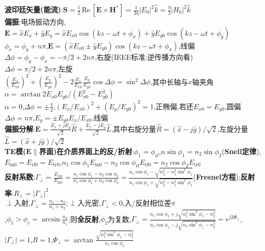 \documentclass[a4paper,10pt]{article}
\providecommand{\abs}[1]{\lvert#1\rvert}
\providecommand{\re}{\,\text{Re}\,}
\begin{document}
\begin{multicols}{2}
\textbf{波印廷矢量(能流)}:$\bm{S}=\frac{1}{2}\re[\bm{E}\times\bm{H}^*]=\frac{1}{2\eta}\abs{E_0}^2\hat{k}=\frac{\eta}{2}\abs{H_0}^2\hat{k}$\\
\textbf{偏振}:电场振动方向,$\bm{E}=\hat{x}E_x+\hat{y}E_y=\hat{x}E_{x0}\cos(kz-\omega t+\phi_x)+\hat{y}E_{y0}\cos(kz-\omega t+\phi_y)$\\
$\phi_x=\phi_y+n\pi$,$\bm{E}=(\hat{x}E_{x0}\pm\hat{y}E_{y0})\cos(kz-\omega t+\phi_x)$,线偏\\
$\Delta\phi=\phi_y-\phi_x=-\pi/2+2n\pi$,右旋(IEEE标准:逆传播方向看)\\
$\Delta\phi=\pi/2+2n\pi$,左旋\\
\indent$(\frac{E_x}{E_{x0}})^2+(\frac{E_y}{E_{y0}})^2-2\frac{E_x}{E_{x0}}\frac{E_y}{E_{y0}}\cos\Delta\phi=\sin^2\Delta\phi$,其中长轴与$x$轴夹角$\alpha=\arctan 2E_{x0}E_{y0}/(E_{x0}^2-E_{y0}^2)$\\
$\alpha=0$,$\Delta\phi=\pm\frac{\pi}{2}$,$(E_x/E_{x0})^2+(E_y/E_{y0})^2=1$,正椭偏,若还$E_{x0}=E_{y0}$,圆偏\\
$\Delta\phi=n\pi$,$E_y=\pm E_{y0}E_x/E_{x0}$,线偏\\
\indent\textbf{偏振分解}:$\bm{E}=\frac{E_x+jE_y}{\sqrt{2}}\hat{R}+\frac{E_x-jE_y}{\sqrt{2}}\hat{L}$,其中右旋分量$\hat{R}=(\hat{x}-j\hat{y})/\sqrt{2}$,左旋分量$\hat{L}=(\hat{x}+j\hat{y})/\sqrt{2}$\\
\textbf{TE模($\bm{E}\parallel$界面)在介质界面上的反/折射}:$\phi_1=\phi_{\text{rf}}$,$n\sin\phi_1=n_2\sin\phi_2$(\textbf{Snell定律}),$E_{\text{in}0}=E_{\text{rf}0}=E_{\text{tr}0}$,$n_1\cos\phi_1E_{\text{in}0}-n_2\cos\phi_{\text{rf}}E_{\text{rf}0}=n_2\cos\phi_2E_{\text{tr}0}$\\
\indent\textbf{反射系数}:$\Gamma_{\perp}=\frac{E_{\text{rf}0}}{E_{\text{in}0}}=\frac{n_1\cos\phi_1-n_2\cos\phi_2}{n_1\cos\phi_1+n_2\cos\phi_2}=\frac{n_1\cos\phi_1-\sqrt{n_2^2-n_1^2\sin^2\phi_1}}{n_1\cos\phi_1+\sqrt{n_2^2-n_1^2\sin^2\phi_1}}$(\textbf{Fresnel方程});\textbf{反射率}:$R_{\perp}=\abs{\Gamma_{\perp}}^2$\\
$\perp$入射,$\Gamma_{\perp}=\frac{n_1-n_2}{n_1+n_2}$;$\perp$入光密,$\Gamma_{\perp}<0$,入/反射相位差$\pi$\\
,$\phi_1>\phi_c=\arcsin\frac{n_2}{n_1}$,则\textbf{全反射},$\phi_2$为复数,$\Gamma_{\perp}=\frac{n_1\cos\phi_1+j\sqrt{n_1^2\sin^2\phi_1-n_2^2}}{n_1\cos\phi_1-j\sqrt{n_1\sin^2\phi_1-n_2^2}}=e^{j2\Phi_{\perp}}$,$\abs{\Gamma_{\perp}}=1$,$R=1$,$\Phi_{\perp}=\arctan\frac{\sqrt{n_1^2\sin^2\phi_1-n_2^2}}{n_1\cos\phi_1}$\\%

\end{multicols}
\end{document}
